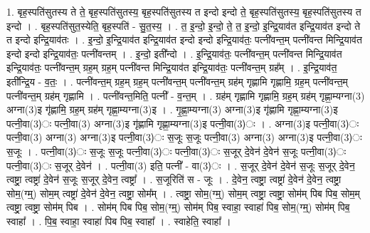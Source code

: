\documentclass[17pt]{extarticle}
\begin{document}
1. बृह॒स्पति॑सुतस्य ते ते॒ बृह॒स्पति॑सुतस्य॒ बृह॒स्पति॑सुतस्य त इन्दो इन्दो ते॒ बृह॒स्पति॑सुतस्य॒ बृह॒स्पति॑सुतस्य त इन्दो । . बृह॒स्पति॑सुत॒स्येति॒ बृह॒स्पति॑ - सु॒त॒स्य॒ । . त॒ इ॒न्दो॒ इ॒न्दो॒ ते॒ त॒ इ॒न्दो॒ इ॒न्द्रि॒याव॑त इन्द्रि॒याव॑त इन्दो ते त इन्दो इन्द्रि॒याव॑तः । . इ॒न्दो॒ इ॒न्द्रि॒याव॑त इन्द्रि॒याव॑त इन्दो इन्दो इन्द्रि॒याव॑तः॒ पत्नी॑वन्त॒म् पत्नी॑वन्त मिन्द्रि॒याव॑त इन्दो इन्दो इन्द्रि॒याव॑तः॒ पत्नी॑वन्तम् । . इ॒न्दो॒ इती᳚न्दो । . इ॒न्द्रि॒याव॑तः॒ पत्नी॑वन्त॒म् पत्नी॑वन्त मिन्द्रि॒याव॑त इन्द्रि॒याव॑तः॒ पत्नी॑वन्त॒म् ग्रह॒म् ग्रह॒म् पत्नी॑वन्त मिन्द्रि॒याव॑त इन्द्रि॒याव॑तः॒ पत्नी॑वन्त॒म् ग्रह᳚म् । . इ॒न्द्रि॒याव॑त॒ इती᳚न्द्रि॒य - व॒तः॒ । . पत्नी॑वन्त॒म् ग्रह॒म् ग्रह॒म् पत्नी॑वन्त॒म् पत्नी॑वन्त॒म् ग्रह॑म् गृह्णामि गृह्णामि॒ ग्रह॒म् पत्नी॑वन्त॒म् पत्नी॑वन्त॒म् ग्रह॑म् गृह्णामि । . पत्नी॑वन्त॒मिति॒ पत्नी᳚ - व॒न्त॒म् । . ग्रह॑म् गृह्णामि गृह्णामि॒ ग्रह॒म् ग्रह॑म् गृह्णा॒म्यग्ना(3) अग्ना(3)इ गृ॑ह्णामि॒ ग्रह॒म् ग्रह॑म् गृह्णा॒म्यग्ना(3)इ । . गृ॒ह्णा॒म्यग्ना(3) अग्ना(3)इ गृ॑ह्णामि गृह्णा॒म्यग्ना(3)इ पत्नी॒वा(3)ः पत्नी॒वा(3) अग्ना(3)इ गृ॑ह्णामि गृह्णा॒म्यग्ना(3)इ पत्नी॒वा(3)ः । . अग्ना(3)इ पत्नी॒वा(3)ः पत्नी॒वा(3) अग्ना(3) अग्ना(3)इ पत्नी॒वा(3)ः स॒जूः स॒जूः पत्नी॒वा(3) अग्ना(3) अग्ना(3)इ पत्नी॒वा(3)ः स॒जूः । . पत्नी॒वा(3)ः स॒जूः स॒जूः पत्नी॒वा(3)ः पत्नी॒वा(3)ः स॒जूर् दे॒वेन॑ दे॒वेन॑ स॒जूः पत्नी॒वा(3)ः पत्नी॒वा(3)ः स॒जूर् दे॒वेन॑ । . पत्नी॒वा(3) इति॒ पत्नी᳚ - वा(3)ः । . स॒जूर् दे॒वेन॑ दे॒वेन॑ स॒जूः स॒जूर् दे॒वेन॒ त्वष्ट्रा॒ त्वष्ट्रा॑ दे॒वेन॑ स॒जूः स॒जूर् दे॒वेन॒ त्वष्ट्रा᳚ । . स॒जूरिति॑ स - जूः । . दे॒वेन॒ त्वष्ट्रा॒ त्वष्ट्रा॑ दे॒वेन॑ दे॒वेन॒ त्वष्ट्रा॒ सोम॒(ग्म्॒) सोम॒म् त्वष्ट्रा॑ दे॒वेन॑ दे॒वेन॒ त्वष्ट्रा॒ सोम᳚म् । . त्वष्ट्रा॒ सोम॒(ग्म्॒) सोम॒म् त्वष्ट्रा॒ त्वष्ट्रा॒ सोम॑म् पिब पिब॒ सोम॒म् त्वष्ट्रा॒ त्वष्ट्रा॒ सोम॑म् पिब । . सोम॑म् पिब पिब॒ सोम॒(ग्म्॒) सोम॑म् पिब॒ स्वाहा॒ स्वाहा॑ पिब॒ सोम॒(ग्म्॒) सोम॑म् पिब॒ स्वाहा᳚ । . पि॒ब॒ स्वाहा॒ स्वाहा॑ पिब पिब॒ स्वाहा᳚ । . स्वाहेति॒ स्वाहा᳚ । \newline
\pagebreak
{}
\end{document}
